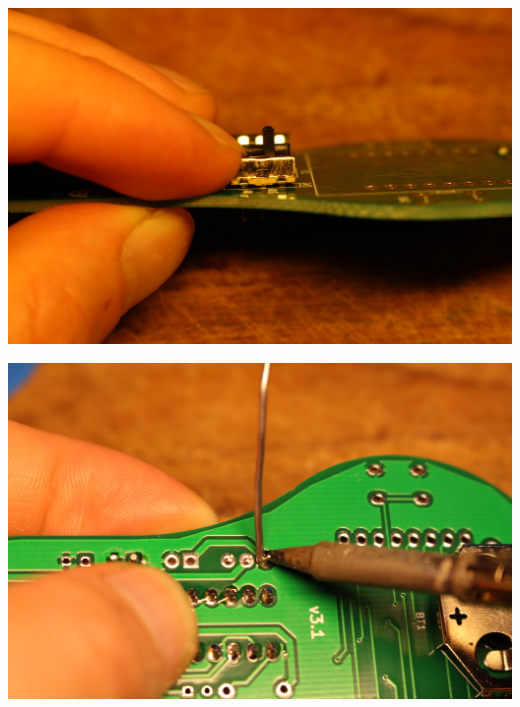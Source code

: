 \documentclass{article}
\begin{document}
\begin{minipage}[b]{0.5\textwidth}
	\includegraphics[width=\textwidth]{Bilder2021/IMG_8149.JPG}
\end{minipage}
\begin{minipage}[b]{0.5\textwidth}
	\includegraphics[width=\textwidth]{Bilder2021/IMG_8150.JPG}
\end{minipage}

\vspace{0.5cm}
\end{document}
